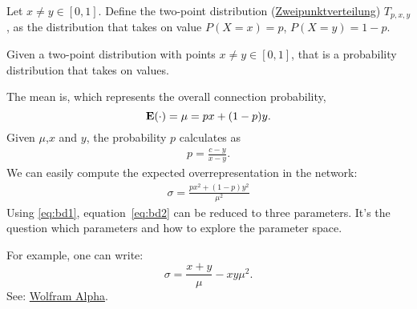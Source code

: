 
Let $x \neq y \in [0,1]$. Define the two-point distribution (\href{https://de.wikipedia.org/wiki/Zweipunktverteilung}{Zweipunktverteilung}) $T_{p,x,y}$, as the distribution that takes on value $P(X=x)=p$, $P(X=y) = 1-p$. 

Given a two-point distribution with points $x \neq y \in [0,1]$, that is a probability distribution that takes on values.

The mean is, which represents the overall connection probability,
\[
\operatorname{\mathbf{E}}(\cdot) = \mu = px + (1-p)y.
\]
Given $\mu$,$x$ and $y$, the probability $p$ calculates as
\begin{align}
  p = \frac{c-y}{x-y}. \label{eq:bd1}
\end{align}
We can easily compute the expected overrepresentation in the network:
\begin{align}
  \sigma = \frac{p x^2 + (1-p) y^2}{\mu^2} \label{eq:bd2}
\end{align}
Using \eqref{eq:bd1}, equation~\eqref{eq:bd2} can be reduced to three parameters. It's the question which parameters and how to explore the parameter space.

For example, one can write:
\[
\sigma = \frac{x+y}{\mu} - {xy}{\mu^2}.
\]
See: \href{https://www.wolframalpha.com/input/?i=Simplify[%28%28%28c-y%29%2F%28x-y%29%29*x^2%2B%281-%28%28c-y%29%2F%28x-y%29%29%29*y^2%29%2Fc^2]}{Wolfram Alpha}.
